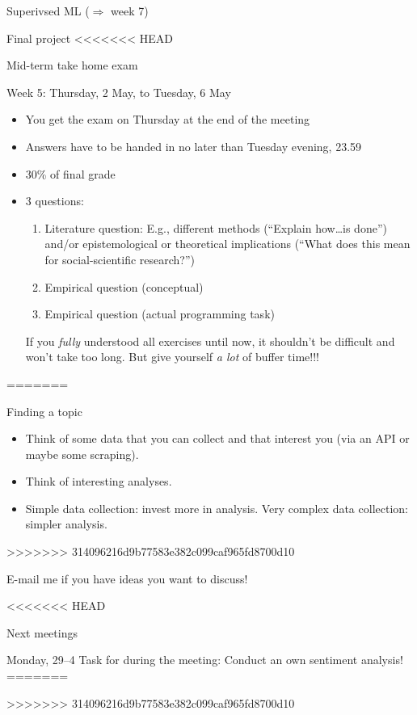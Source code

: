 \documentclass{beamer}
\begin{document}
\begin{frame}{Superivsed ML ($\Rightarrow$ week 7)}
\begin{frame}{Final project}
<<<<<<< HEAD
\begin{frame}{Mid-term take home exam}
\begin{block}{Week 5: Thursday, 2 May, to Tuesday, 6 May}
\begin{itemize}
\item You get the exam on Thursday at the end of the meeting
\item Answers have to be handed in no later than Tuesday evening, 23.59
\item 30\% of final grade
\item 3 questions:
\begin{enumerate}
\item Literature question: E.g., different methods (``Explain how\ldots is done'') and/or epistemological or theoretical implications (``What does this mean for social-scientific research?'')
\item Empirical question (conceptual)
\item Empirical question (actual programming task)
\end{enumerate}
If you \emph{fully} understood all exercises until now, it shouldn't be difficult and won't take too long. But give yourself \emph{a lot} of buffer time!!! 
\end{itemize}
\end{block}
\end{frame}
=======
  \begin{block}{Finding a topic}
    \begin{itemize}
    \item Think of some data that you can collect and that interest you (via an API or maybe some scraping). 
    \item Think of interesting analyses.
    \item Simple data collection: invest more in analysis. Very complex data collection: simpler analysis.
    \end{itemize}
>>>>>>> 314096216d9b77583e382c099caf965fd8700d10

    E-mail me if you have ideas you want to discuss!
    \end{block}

\end{frame}

<<<<<<< HEAD
\begin{frame}{Next meetings}
\begin{block}{Monday, 29--4}
Task for during the meeting: Conduct an own sentiment analysis!
=======

>>>>>>> 314096216d9b77583e382c099caf965fd8700d10


\end{block}
\end{frame}
\end{frame}
\end{document}
